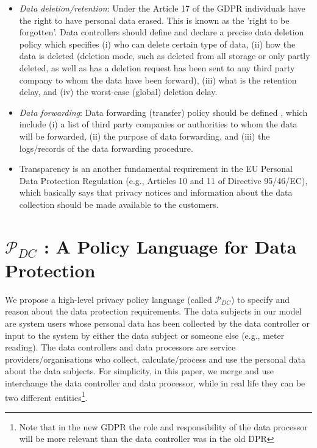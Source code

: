 \documentclass[a4paper]{article}
\begin{document}
\begin{itemize}
\item \textit{Data deletion/retention}: Under the Article 17 of the GDPR \cite{ico3} individuals have the right to have personal data erased. This is known as the 'right to be forgotten'. Data controllers should define and declare a precise data deletion policy which specifies (i) who can delete certain type of data, (ii) how the data is deleted (deletion mode, such as deleted from all storage or only partly deleted, as well as has a deletion request has been sent to any third party company to whom the data have been forward), (iii) what is the retention delay, and (iv) the worst-case (global) deletion delay.      




\item \textit{Data forwarding}: Data forwarding (transfer) policy should be defined \cite{ButinTN15, d95}, which include (i) a list of third party companies or authorities to whom the data will be forwarded, (ii) the purpose of data  forwarding, and (iii) the logs/records of the data forwarding procedure.      

\item Transparency is an another fundamental requirement in the EU Personal Data Protection Regulation (e.g., Articles 10 and 11 of Directive 95/46/EC)\cite{EUtrans, d95}, which basically says that privacy notices and information about the data collection should be made available to the customers. 



\end{itemize}
\section{$\mathcal{P}_{DC}$ : A Policy Language for Data Protection}
\label{sec:polgen} 
We propose a high-level privacy policy language (called $\mathcal{P}_{DC}$) to specify and reason about the data protection requirements. The data subjects in our model are system users whose personal data has been collected by the data controller or input to the system by either the data subject or someone else (e.g., meter reading). The data controllers and data processors are service providers/organisations who collect, calculate/process and use the personal data about the data subjects.  For simplicity, in this paper, we merge and use interchange the data controller and data processor, while in real life they can be two different entities\footnote{Note that in the new GDPR the role and responsibility of the data processor will be more relevant than the data controller was in the old DPR}.  
\end{document}
